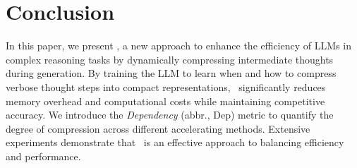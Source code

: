 \vspace{-1mm}
\section{Conclusion}
\vspace{-1mm}
In this paper, we present \ours, a new approach to enhance the efficiency of LLMs in complex reasoning tasks by dynamically compressing intermediate thoughts during generation. 
By training the LLM to learn when and how to compress verbose thought steps into compact representations, \ours~significantly reduces memory overhead and computational costs while maintaining competitive accuracy. 
We introduce the \textit{Dependency} (abbr., Dep) metric to quantify the degree of compression across different accelerating methods.
Extensive experiments demonstrate that \ours~is an effective approach to balancing efficiency and performance. 




